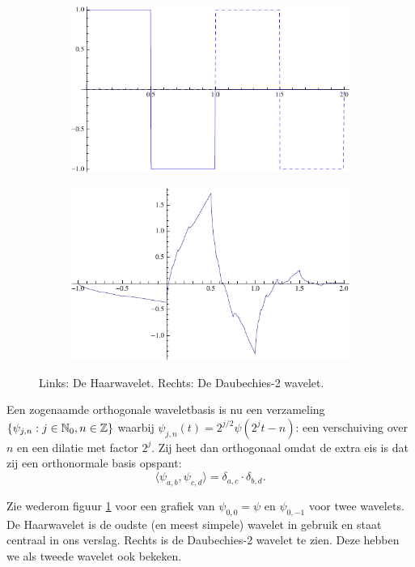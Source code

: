 \begin{figure}[h]
  \centering
  \begin{subfigure}{0.48\linewidth}
    \includegraphics[width=\linewidth]{plaatjes/db1.pdf}
  \end{subfigure}
  \begin{subfigure}{0.48\linewidth}
    \includegraphics[width=\linewidth]{plaatjes/db2_psi.pdf}
  \end{subfigure}
  \caption{Links: De Haarwavelet. Rechts: De Daubechies-2 wavelet.}
\label{fig:samenv}
\end{figure}

Een zogenaamde orthogonale waveletbasis is nu een verzameling $\{ \psi_{j,n}: j \in \mathbb{N}_0, n \in \mathbb{Z} \}$ waarbij $\psi_{j,n}(t) = 2^{j/2} \psi(2^jt - n)$: een verschuiving over $n$ en een dilatie met factor $2^j$. Zij heet dan orthogonaal omdat de extra eis is dat zij een orthonormale basis opspant: \[\langle \psi_{a,b}, \psi_{c,d} \rangle = \delta_{a,c} \cdot \delta_{b,d}.\]

Zie wederom figuur \ref{fig:samenv} voor een grafiek van $\psi_{0,0} = \psi$ en $\psi_{0,-1}$ voor twee wavelets. De Haarwavelet is de oudste (en meest simpele) wavelet in gebruik en staat centraal in ons verslag. Rechts is de Daubechies-2 wavelet te zien. Deze hebben we als tweede wavelet ook bekeken.

